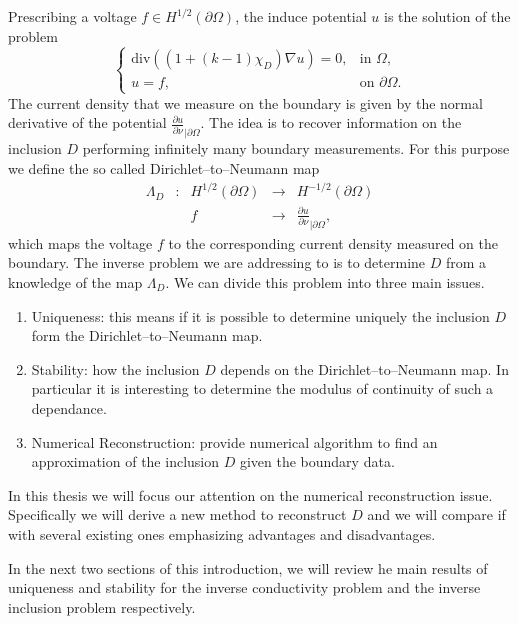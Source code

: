 \documentclass[10pt, a4paper, twoside, openright]{book}
\theoremstyle{definition}
\theoremstyle{plain}
\theoremstyle{plain}
\theoremstyle{plain}
\theoremstyle{plain}
\theoremstyle{plain}
\theoremstyle{plain}
\theoremstyle{plain}
\theoremstyle{plain}
\begin{document}
Prescribing a voltage $f\in H^{1/2}(\partial\Omega)$, the induce potential $u$ is the solution of the problem
$$\left\{\begin{array}{ll}
\mathrm{div}((1+(k-1)\chi_D)\nabla u)=0, & \textrm{in }\Omega,\\
u=f, & \textrm{on }\partial\Omega.
\end{array}\right.$$
The current density that we measure on the boundary is given by the normal derivative of the potential
$\frac{\partial u}{\partial\nu}_{|\partial\Omega}$. The idea is to recover information on the inclusion $D$ performing infinitely many
boundary measurements. For this purpose we define the so called Dirichlet--to--Neumann map
$$\begin{array}{ccccc}
\Lambda_D & : & H^{1/2}(\partial\Omega) & \longrightarrow & H^{-1/2}(\partial\Omega)\\
          &   &   f                     & \longrightarrow & \frac{\partial u}{\partial\nu}_{|\partial\Omega},
\end{array}$$
which maps the voltage $f$ to the corresponding current density measured on the boundary.
The inverse problem we are addressing to is to determine $D$ from a knowledge of the map $\Lambda_D$.
We can divide this problem into three main issues.
\begin{enumerate}
\item Uniqueness: this means if it is possible to determine uniquely the inclusion $D$ form the Dirichlet--to--Neumann map.
\item Stability: how the inclusion $D$ depends on the Dirichlet--to--Neumann map. In particular it is interesting
to determine the modulus of continuity of such a dependance.
\item Numerical Reconstruction: provide numerical algorithm to find an approximation of the inclusion $D$ given the boundary data.
\end{enumerate}
In this thesis we will focus our attention on the numerical reconstruction issue.
Specifically we will derive a new method to reconstruct $D$ and we will compare if with several existing ones
emphasizing advantages and disadvantages.

In the next two sections of this introduction, we will review he main results of uniqueness and stability
for the inverse conductivity problem and the inverse inclusion problem respectively.


\end{document}

